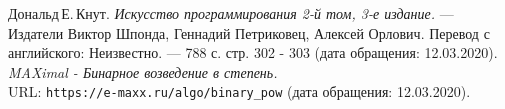 \begin{thebibliography}{99}
Дональд\,Е.\,Кнут.
{\itshape Искусство программирования 2-й том, 3-е издание.} --- Издатели Виктор Шпонда, Геннадий Петриковец, Алексей Орлович. Перевод с английского: Неизвестно. --- 788 с. стр. 302 - 303 (дата обращения: 12.03.2020).
{\itshape MAXimal - Бинарное возведение в степень.} \\URL: \texttt{https://e-maxx.ru/algo/binary\_pow} (дата обращения: 12.03.2020).
\end{thebibliography}
\pagebreak